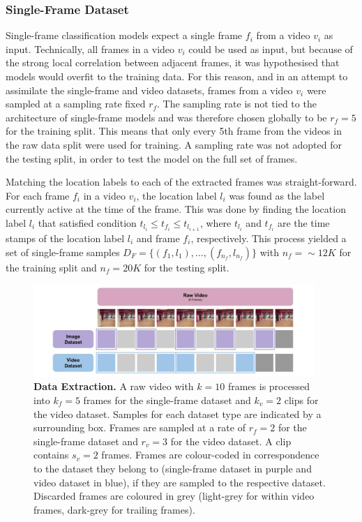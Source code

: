 \documentclass[a4paper]{article}
\begin{document}
\subsubsection{Single-Frame Dataset} %

Single-frame classification models expect a single frame $f_i$ from a video
$v_i$ as input. Technically, all frames in a video $v_i$ could be used as input,
but because of the strong local correlation between adjacent frames, it was
hypothesised that models would overfit to the training data. For this reason,
and in an attempt to assimilate the single-frame and video datasets, frames from
a video $v_i$ were sampled at a sampling rate fixed $r_f$. The sampling rate is
not tied to the architecture of single-frame models and was therefore chosen
globally to be $r_f=5$ for the training split. This means that only every 5th
frame from the videos in the raw data split were used for training. A sampling
rate was not adopted for the testing split, in order to test the model on the
full set of frames.

Matching the location labels to each of the extracted frames was
straight-forward. For each frame $f_i$ in a video $v_i$, the location label
$l_i$ was found as the label currently active at the time of the frame. This was
done by finding the location label $l_i$ that satisfied condition $t_{l_i} \leq
t_{f_i} \leq t_{l_{i+1}}$, where $t_{l_i}$ and $t_{f_i}$ are the time stamps of
the location label $l_i$ and frame $f_i$, respectively. This process yielded a
set of single-frame samples $D_F = \{(f_1, l_1), ..., (f_{n_f}, l_{n_f})\}$ with
$n_f=\sim 12K$ for the training split and $n_f=20K$ for the testing split.

\begin{figure}
\centering
\includegraphics[width=0.95\textwidth]{figures/data-extraction.png}
\caption{
  \textbf{Data Extraction.} A raw video with $k=10$ frames is processed into
  $k_f=5$ frames for the single-frame dataset and $k_v=2$ clips for the
  video dataset. Samples for each dataset type are indicated by a
  surrounding box. Frames are sampled at a rate of $r_f=2$ for the
  single-frame dataset and $r_v=3$ for the video dataset. A clip contains
  $s_v=2$ frames. Frames are colour-coded in correspondence to the dataset
  they belong to (single-frame dataset in purple and video dataset in blue),
  if they are sampled to the respective dataset. Discarded frames are
  coloured in grey (light-grey for within video frames, dark-grey for
  trailing frames).}
\label{fig:data-extraction}
\end{figure}
\end{document}
